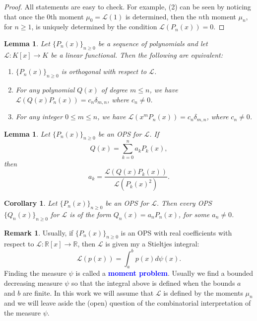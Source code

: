\documentclass{amsart}
\numberwithin{equation}{section}
\newtheorem{lem}[thm]{Lemma}
\newtheorem{cor}[thm]{Corollary}
\theoremstyle{definition}
\newtheorem{remark}[thm]{Remark}
\newcommand{\RR}{\mathbb{R}}
\newcommand\LL{\mathcal{L}}
\renewcommand\emph[1]{\textcolor{blue}{\bf #1}}
\begin{document}
\begin{proof}
  All statements are easy to check. For example, (2) can be seen by
  noticing that once the \( 0 \)th moment \( \mu_0=\LL(1) \) is
  determined, then the \( n \)th moment \( \mu_n \), for \( n\ge1 \),
  is uniquely determined by the condition \( \LL(P_n(x)) = 0 \).
\end{proof}


\begin{lem}
  Let \( \{ P_n(x) \}_{n\ge 0} \) be a sequence of polynomials
  and let \( \LL:K[x] \to K \) be a linear functional.
  Then the following are equivalent:
  \begin{enumerate}
  \item \( \{ P_n(x) \}_{n\ge 0} \) is orthogonal with respect to \( \LL \).
  \item For any polynomial \( Q(x) \) of degree \( m\le n \),
    we have \( \LL(Q(x) P_n(x)) = c_n \delta_{m,n} \), where \( c_n\ne 0 \).
  \item For any integer \( 0\le m\le n \), we have
    \( \LL(x^m P_n(x)) = c_n \delta_{m,n} \), where \( c_n\ne 0 \).
  \end{enumerate}
\end{lem}

\begin{lem}
  Let \( \{ P_n(x) \}_{n\ge 0} \) be an OPS for \( \LL \).
  If
  \[
    Q(x) = \sum_{k=0}^{n} a_k P_k(x),
  \]
  then
  \[
    a_k = \frac{\LL(Q(x)P_k(x))}{\LL(P_k(x)^2)}.
  \]
\end{lem}


\begin{cor}
  Let \( \{ P_n(x) \}_{n\ge 0} \) be an OPS for \( \LL \).
  Then every OPS \( \{ Q_n(x) \}_{n\ge 0} \)
  for \( \LL \) is of the form \( Q_n(x) = a_n P_n(x) \),
  for some \( a_n\ne 0 \).
\end{cor}


\begin{remark}
  Usually, if \( \{ P_n(x) \}_{n\ge 0} \) is an OPS with real coefficients
  with respect to \( \LL:\RR[x] \to \RR \), then
  \( \LL \) is given my a Stieltjes integral:
  \[
    \LL(p(x)) = \int_a^b p(x) d\psi(x).
  \]
  Finding the measure \( \psi \) is called a \emph{moment problem}.
  Usually we find a bounded decreasing measure \( \psi \) so that the
  integral above is defined when the bounds \( a \) and \( b \) are
  finite. In this work we will assume that \( \LL \) is defined by the
  moments \( \mu_n \) and we will leave aside the (open) question of
  the combinatorial interpretation of the measure \( \psi \).
\end{remark}
\end{document}
